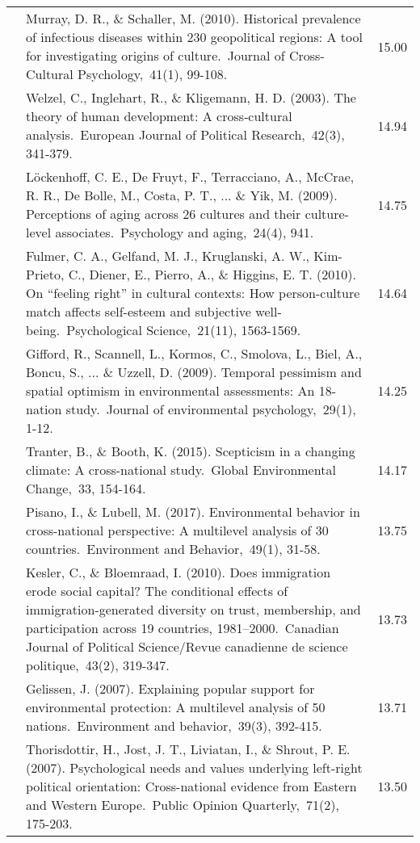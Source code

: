 \documentclass[
  man,floatsintext]{apa6}
\begin{document}
\begin{center}
\begin{ThreePartTable}
{\begin{longtable}{m{2cm}m{11cm}m{2cm}}
 & Murray, D. R., \& Schaller, M. (2010). Historical prevalence of infectious diseases within 230 geopolitical regions: A tool for investigating origins of culture. Journal of Cross-Cultural Psychology, 41(1), 99-108. & 15.00\\
 & Welzel, C., Inglehart, R., \& Kligemann, H. D. (2003). The theory of human development: A cross‐cultural analysis. European Journal of Political Research, 42(3), 341-379. & 14.94\\
 & Löckenhoff, C. E., De Fruyt, F., Terracciano, A., McCrae, R. R., De Bolle, M., Costa, P. T., ... \& Yik, M. (2009). Perceptions of aging across 26 cultures and their culture-level associates. Psychology and aging, 24(4), 941. & 14.75\\
 & Fulmer, C. A., Gelfand, M. J., Kruglanski, A. W., Kim-Prieto, C., Diener, E., Pierro, A., \& Higgins, E. T. (2010). On “feeling right” in cultural contexts: How person-culture match affects self-esteem and subjective well-being. Psychological Science, 21(11), 1563-1569. & 14.64\\
 & Gifford, R., Scannell, L., Kormos, C., Smolova, L., Biel, A., Boncu, S., ... \& Uzzell, D. (2009). Temporal pessimism and spatial optimism in environmental assessments: An 18-nation study. Journal of environmental psychology, 29(1), 1-12. & 14.25\\
 & Tranter, B., \& Booth, K. (2015). Scepticism in a changing climate: A cross-national study. Global Environmental Change, 33, 154-164. & 14.17\\
 & Pisano, I., \& Lubell, M. (2017). Environmental behavior in cross-national perspective: A multilevel analysis of 30 countries. Environment and Behavior, 49(1), 31-58. & 13.75\\
 & Kesler, C., \& Bloemraad, I. (2010). Does immigration erode social capital? The conditional effects of immigration-generated diversity on trust, membership, and participation across 19 countries, 1981–2000. Canadian Journal of Political Science/Revue canadienne de science politique, 43(2), 319-347. & 13.73\\
 & Gelissen, J. (2007). Explaining popular support for environmental protection: A multilevel analysis of 50 nations. Environment and behavior, 39(3), 392-415. & 13.71\\
 & Thorisdottir, H., Jost, J. T., Liviatan, I., \& Shrout, P. E. (2007). Psychological needs and values underlying left-right political orientation: Cross-national evidence from Eastern and Western Europe. Public Opinion Quarterly, 71(2), 175-203. & 13.50\\

\end{longtable}}
\end{ThreePartTable}
\end{center}
\end{document}
